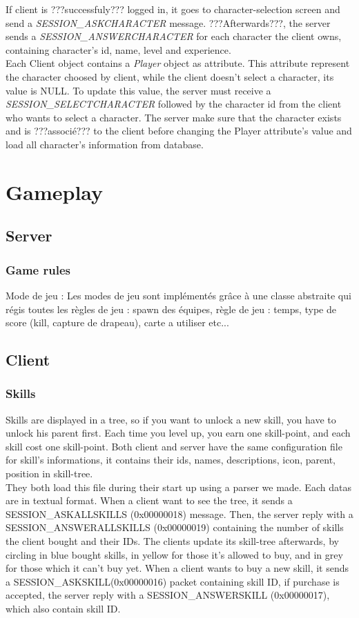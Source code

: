 \documentclass{scrreprt}
\begin{document}
		If client is ???successfuly??? logged in, it goes to character-selection screen and send a \emph{SESSION\_ASKCHARACTER} message. ???Afterwards???, the server sends a \emph{SESSION\_ANSWERCHARACTER} for each character the client owns, containing character's id, name, level and experience.\\
		Each Client object contains a \emph{Player} object as attribute. This attribute represent the character choosed by client, while the client doesn't select a character, its value is NULL. To update this value, the server must receive a \emph{SESSION\_SELECTCHARACTER} followed by the character id from the client who wants to select a character. The server make sure that the character exists and is ???associé??? to the client before changing the Player attribute's value and load all character's information from database.



		\section{Gameplay}
		\subsection{Server}
		\subsubsection{Game rules}
		Mode de jeu :
		Les modes de jeu sont implémentés grâce à une classe abstraite qui régis toutes les règles de jeu : spawn des équipes, règle de jeu : temps, type de score (kill, capture de drapeau), carte a utiliser etc...
		\subsection{Client}
		\subsubsection{Skills}
		Skills are displayed in a tree, so if you want to unlock a new skill, you have to unlock his parent first. Each time you level up, you earn one skill-point, and each skill cost one skill-point. Both client and server have the same configuration file for skill's informations, it contains their ids, names, descriptions, icon, parent, position in skill-tree.\\

		They both load this file during their start up using a parser we made. Each datas are in textual format. When a client want to see the tree, it sends a SESSION\_ASKALLSKILLS (0x00000018) message. Then, the server reply with a SESSION\_ANSWERALLSKILLS (0x00000019) containing the number of skills the client bought and their IDs. The clients update its skill-tree afterwards, by circling in blue bought skills, in yellow for those it's allowed to buy, and in grey for those which it can't buy yet.
		When a client wants to buy a new skill, it sends a SESSION\_ASKSKILL(0x00000016) packet containing skill ID, if purchase is accepted, the server reply with a SESSION\_ANSWERSKILL (0x00000017), which also contain skill ID.\\
\end{document}
